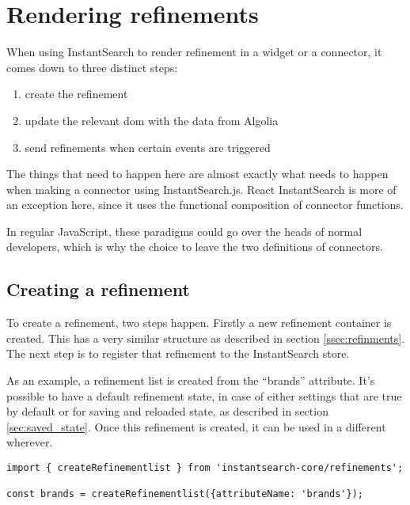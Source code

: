 
\section{Rendering \glspl{refinement}} %
\label{sec:rendering_refinements}

When using InstantSearch to render refinement in a widget or a connector, it comes down to three distinct steps:

\begin{enumerate}
  \item create the refinement
  \item update the relevant \acrshort{dom} with the data from Algolia
  \item send \glspl{refinement} when certain events are triggered
\end{enumerate}

The things that need to happen here are almost exactly what needs to happen when making a connector using InstantSearch.js. React InstantSearch is more of an exception here, since it uses the functional composition of connector functions.

In regular JavaScript, these paradigms could go over the heads of normal developers, which is why the choice to leave the two definitions of connectors.

\subsection{Creating a refinement}
\label{subs:creating_a_refinement}

To create a refinement, two steps happen. Firstly a new refinement container is created. This has a very similar structure as described in section \ref{ssec:refinments}. The next step is to register that refinement to the InstantSearch store.

As an example, a refinement list is created from the ``brands'' attribute. It's possible to have a default refinement state, in case of either settings that are true by default or for saving and reloaded state, as described in section \ref{sec:saved_state}. Once this refinement is created, it can be used in a different wherever.

\begin{minipage}{\linewidth}
\begin{lstlisting}[caption={Creating a refinement},label={lst:creating-refinement}]
import { createRefinementlist } from 'instantsearch-core/refinements';

const brands = createRefinementlist({attributeName: 'brands'});
\end{lstlisting}
\end{minipage}

